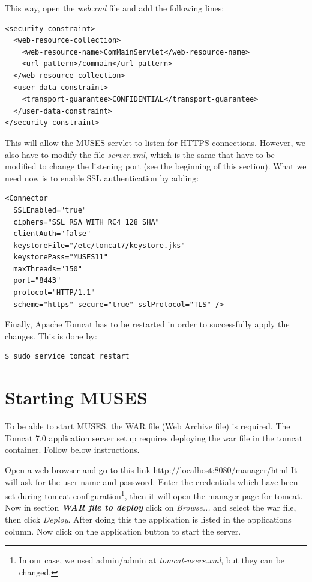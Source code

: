 \documentclass[a4paper,11pt]{book}
\begin{document}
This way, open the \textit{web.xml} file and add the following lines:

\begin{verbatim}
<security-constraint>
  <web-resource-collection>
    <web-resource-name>ComMainServlet</web-resource-name>
    <url-pattern>/commain</url-pattern>
  </web-resource-collection>
  <user-data-constraint>
    <transport-guarantee>CONFIDENTIAL</transport-guarantee>
  </user-data-constraint>
</security-constraint>
\end{verbatim}

This will allow the MUSES servlet to listen for HTTPS connections. However, we also have to modify the file \textit{server.xml}, which is the same that have to be modified to change the listening port (see the beginning of this section). What we need now is to enable SSL authentication by adding:

\begin{verbatim}
<Connector
  SSLEnabled="true"
  ciphers="SSL_RSA_WITH_RC4_128_SHA"
  clientAuth="false"
  keystoreFile="/etc/tomcat7/keystore.jks"
  keystorePass="MUSES11"
  maxThreads="150"
  port="8443"
  protocol="HTTP/1.1"
  scheme="https" secure="true" sslProtocol="TLS" />
\end{verbatim}

Finally, Apache Tomcat has to be restarted in order to successfully apply the changes. This is done by:

\begin{verbatim}
$ sudo service tomcat restart
\end{verbatim}

\section{Starting MUSES}
\label{sec:musestart}

To be able to start MUSES, the WAR file (Web Archive file) is required. %
The Tomcat 7.0 application server setup requires deploying the war file in the tomcat container. Follow below instructions. 

Open a web browser and go to this link
\url{http://localhost:8080/manager/html} 
It will ask for the user name and password. Enter the credentials which have been set during tomcat configuration\footnote{In our case, we used admin/admin at \textit{tomcat-users.xml}, but they can be changed.}, then it will open the manager page for tomcat. Now in section \textit{\textbf{WAR file to deploy}} click on \textit{Browse...} and select the war file, then click \textit{Deploy}. 
After doing this the application is listed in the applications column. Now click on the application button to start the server.



\end{document}
